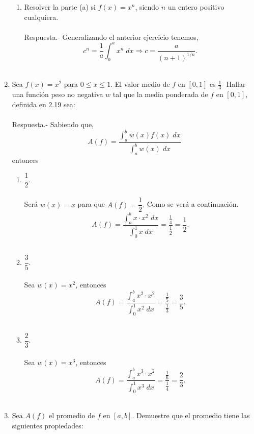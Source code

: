 \begin{enumerate}[\bfseries 1.]
\begin{enumerate}[\bfseries (a)]
	\item Resolver la parte (a) si $f(x) = x^n$, siendo $n$ un entero positivo cualquiera.\\\\
	    Respuesta.-\; Generalizando el anterior ejercicio tenemos,
	    $$c^n = \frac{1}{a}\int_0^a x^n \; dx \Longrightarrow c = \dfrac{a}{(n+1)^{1/n}}.$$\\

    \end{enumerate}

\item Sea $f(x)=x^2$ para $0\leq x \leq 1$. El valor medio de $f$ en $[0,1]$ es $\frac{1}{3}$- Hallar una función peso no negativa $w$ tal que la media ponderada de $f$ en $[0,1]$, definida en 2.19 sea:\\\\
	    Respuesta.-\; Sabiendo que,
	    $$A(f)=\dfrac{\int_a^b w(x)f(x)\; dx}{\int_a^b w(x)\; dx}$$
	    entonces 

    \begin{enumerate}[\bfseries (a)]

	\item $\dfrac{1}{2}.$\\\\
	    Será $w(x)=x$ para que $A(f)=\dfrac{1}{2}.$ Como se verá a continuación.
	    $$A(f)=\dfrac{\int_a^b x\cdot x^2 \; dx}{\int_0^1 x\; dx}=\dfrac{\frac{1}{4}}{\frac{1}{2}}=\dfrac{1}{2}.$$\\

	\item $\dfrac{3}{5}.$\\\\
	    Sea $w(x)=x^2$, entonces
	    $$A(f)=\dfrac{\int_a^b x^2\cdot x^2}{\int_0^1 x^2\; dx}=\dfrac{\frac{1}{5}}{\frac{1}{3}}=\dfrac{3}{5}.$$\\

	\item $\dfrac{2}{3}$.\\\\
	    Sea $w(x)=x^3$, entonces
	    $$A(f)=\dfrac{\int_a^b x^3\cdot x^2}{\int_0^1 x^3\; dx}=\dfrac{\frac{1}{6}}{\frac{1}{4}}=\dfrac{2}{3}.$$\\

    \end{enumerate}

\item Sea $A(f)$ el promedio de $f$ en $[a,b]$. Demuestre que el promedio tiene las siguientes propiedades:
    \begin{enumerate}[\bfseries (a)]


\end{enumerate}
\end{enumerate}
